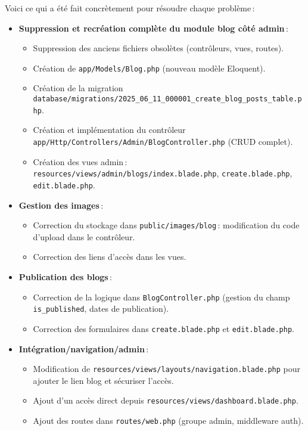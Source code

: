 \documentclass[a4paper,12pt]{report}
\begin{document}
Voici ce qui a été fait concrètement pour résoudre chaque problème :
\begin{itemize}
    \item \textbf{Suppression et recréation complète du module blog côté admin} :
    \begin{itemize}
        \item Suppression des anciens fichiers obsolètes (contrôleurs, vues, routes).
        \item Création de \texttt{app/Models/Blog.php} (nouveau modèle Eloquent).
        \item Création de la migration \texttt{database/migrations/2025\_06\_11\_000001\_create\_blog\_posts\_table.php}.
        \item Création et implémentation du contrôleur \texttt{app/Http/Controllers/Admin/BlogController.php} (CRUD complet).
        \item Création des vues admin : \texttt{resources/views/admin/blogs/index.blade.php}, \texttt{create.blade.php}, \texttt{edit.blade.php}.
    \end{itemize}
    \item \textbf{Gestion des images} :
    \begin{itemize}
        \item Correction du stockage dans \texttt{public/images/blog} : modification du code d’upload dans le contrôleur.
        \item Correction des liens d’accès dans les vues.
    \end{itemize}
    \item \textbf{Publication des blogs} :
    \begin{itemize}
        \item Correction de la logique dans \texttt{BlogController.php} (gestion du champ \texttt{is\_published}, dates de publication).
        \item Correction des formulaires dans \texttt{create.blade.php} et \texttt{edit.blade.php}.
    \end{itemize}
    \item \textbf{Intégration/navigation/admin} :
    \begin{itemize}
        \item Modification de \texttt{resources/views/layouts/navigation.blade.php} pour ajouter le lien blog et sécuriser l’accès.
        \item Ajout d’un accès direct depuis \texttt{resources/views/dashboard.blade.php}.
        \item Ajout des routes dans \texttt{routes/web.php} (groupe admin, middleware auth).

\end{itemize}
\end{itemize}
\end{document}
